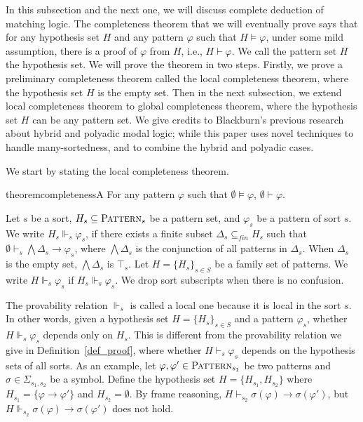 \documentclass[acmsmall]{acmart}
\theoremstyle{acmdefinition}
\newcommand{\imp}{\to}
\newcommand{\Pattern}{\textnormal{\textsc{Pattern}}}
\newcommand{\fin}{\mathit{fin}}
\begin{document}
In this subsection and the next one, we will discuss
complete deduction of matching logic.
The completeness theorem that we will eventually prove
says that 
for any hypothesis set $H$
and any pattern $\varphi$ such that $H \vDash \varphi$,
under some mild assumption,
there is a proof of $\varphi$ from $H$, i.e., 
$H \vdash \varphi$.
We call the pattern set $H$ the hypothesis set.
We will prove the theorem in two steps.
Firstly, we prove a preliminary completeness theorem
called the local completeness theorem, where the hypothesis set $H$ 
is the empty set.
Then in the next subsection, we extend 
local completeness theorem to global completeness theorem,
where the hypothesis set $H$ can be any pattern set.
We give credits to Blackburn's previous research
about hybrid and polyadic modal logic; while this paper
uses novel techniques to handle many-sortedness,
and to combine the hybrid and polyadic cases.

We start by stating the local completeness theorem.

\begin{restatable}{theorem}{completenessA}
\label{thm_completeness_A}
For any pattern $\varphi$ such that $\emptyset \vDash \varphi$, 
$\emptyset \vdash \varphi$.
\end{restatable}




\begin{definition}
Let $s$ be a sort,
$H_s \subseteq \Pattern_s$ be a pattern set,
and $\varphi_s$ be a pattern of sort $s$. 
We write $H_s \Vdash_s \varphi_s$,
if there exists a finite subset $\Delta_s \subseteq_\fin H_s$ such that
$\emptyset \vdash_s \bigwedge \Delta_s \imp \varphi_s$, where $\bigwedge 
\Delta_s$ is the conjunction of all patterns in $\Delta_s$.
When $\Delta_s$ is the empty set, $\bigwedge \Delta_s$ is $\top_s$.
Let $H = \{ H_s \}_{s \in S}$ be a family set of patterns.
We write $H \Vdash_s \varphi_s$ if $H_s \Vdash_s \varphi_s$.
We drop sort subscripts when there is no confusion.
\end{definition}

The provability relation $\Vdash_s$ is called a {local} one
because it is local in the sort $s$.
In other words, given a hypothesis set
$H = \{ H_s \}_{s \in S}$ and a pattern $\varphi_s$,
whether $H \Vdash_s \varphi_s$ depends only on $H_s$.
This is different from the provability relation we give in
Definition~\ref{def_proof}, where
whether $H \vdash_s \varphi_s$ depends on the hypothesis sets of all sorts.
As an example, let $\varphi,\varphi' \in \Pattern_{s_1}$ be two patterns
and $\sigma \in \Sigma_{s_1,s_2}$ be a symbol.
Define the hypothesis set
$H = \{ H_{s_1} , H_{s_2} \}$ where 
$H_{s_1} = \{ \varphi \imp \varphi' \}$
and $H_{s_2} = \emptyset$.
By frame reasoning, 
$H \vdash_{s_2} \sigma(\varphi) \imp \sigma(\varphi')$,
but
$H \Vdash_{s_2} \sigma(\varphi) \imp \sigma(\varphi')$ does not hold.
\end{document}

